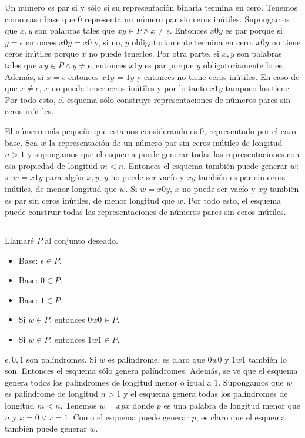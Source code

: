 \documentclass{article}
\begin{document}
Un número es par si y sólo si su representación binaria termina en cero.
Tenemos como caso base que $0$ representa un número par sin ceros inútiles.
Supongamos que $x,y$ son palabras tales que $xy \in P \wedge x \neq \epsilon$.
Entonces $x0y$ es par porque si $y = \epsilon$ entonces $x0y = x0$ y, si no,
$y$ obligatoriamente termina en cero. $x0y$ no tiene ceros inútiles porque $x$
no puede tenerlos. Por otra parte, si $x, y$ son palabras tales que
$xy \in P \wedge y \neq \epsilon$, entonces $x1y$ es par porque $y$
obligatoriamente lo es. Además, si $x = \epsilon$ entonces $x1y$ = $1y$ y
entonces no tiene ceros inútiles. En caso de que $x \neq \epsilon$, $x$ no puede
tener ceros inútiles y por lo tanto $x1y$ tampoco los tiene. Por todo esto, el
esquema sólo construye representaciones de números pares sin ceros inútiles.

El número más pequeño que estamos considerando es $0$, representado por el
caso base. Sea $w$ la representación de un número par sin ceros inútiles de
longitud $n > 1$ y supongamos que el esquema puede generar todas las
representaciones con esa propiedad de longitud $m < n$. Entonces el esquema
también puede generar $w$: si $w = x1y$ para algún $x, y$, $y$ no puede ser
vacío y $xy$ también es par sin ceros inútiles, de menor longitud que $w$. Si
$w = x0y$, $x$ no puede ser vacío y $xy$ también es par sin ceros inútiles, de
menor longitud que $w$.
Por todo esto, el esquema puede construir todas las representaciones de números
pares sin ceros inútiles.

\subsection{}

Llamaré $P$ al conjunto deseado.

\begin{itemize}
\item Base: $\epsilon \in P$.
\item Base: $0 \in P$.
\item Base: $1 \in P$.
\item Si $w \in P$, entonces $0w0 \in P$.
\item Si $w \in P$, entonces $1w1 \in P$.
\end{itemize}

$\epsilon, 0, 1$ son palíndromes. Si $w$ es palíndrome, es claro que $0w0$ y
$1w1$ también lo son. Entonces el esquema sólo genera palíndromes. Además, se ve
que el esquema genera todos los palíndromes de longitud menor o igual a $1$.
Supongamos que $w$ es palíndrome de longitud $n > 1$ y el esquema genera todas
los palíndromes de longitud $m < n$. Tenemos $w = xpx$ donde $p$ es
una palabra de longitud menor que $n$ y $x = 0 \vee x = 1$.
Como el esquema puede generar $p$, es claro que el esquema también puede generar
$w$.
\end{document}
